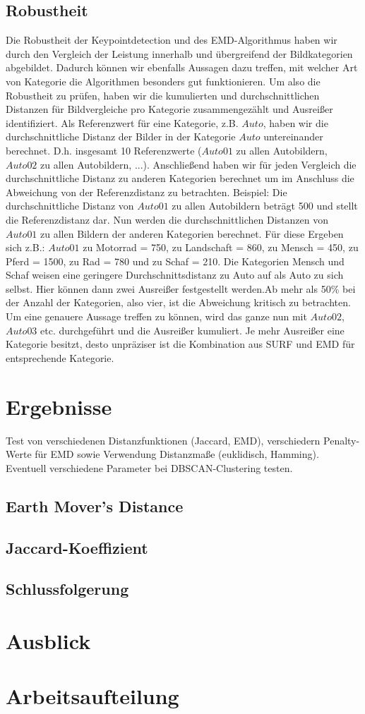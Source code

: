 \documentclass{scrartcl}
\begin{document}
\subsection{Robustheit}
Die Robustheit der Keypointdetection und des EMD-Algorithmus haben wir durch den Vergleich der Leistung innerhalb und übergreifend der Bildkategorien abgebildet. Dadurch können wir ebenfalls Aussagen dazu treffen, mit welcher Art von Kategorie die Algorithmen besonders gut funktionieren. Um also die Robustheit zu prüfen, haben wir die kumulierten und durchschnittlichen Distanzen für Bildvergleiche pro Kategorie zusammengezählt und Ausreißer identifiziert. Als Referenzwert für eine Kategorie, z.B. $Auto$, haben wir die durchschnittliche Distanz der Bilder in der Kategorie $Auto$ untereinander berechnet. D.h. insgesamt 10 Referenzwerte ($Auto01$ zu allen Autobildern, $Auto02$ zu allen Autobildern, ...). Anschließend haben wir für jeden Vergleich die durchschnittliche Distanz zu anderen Kategorien berechnet um im Anschluss die Abweichung von der Referenzdistanz zu betrachten.
Beispiel: Die durchschnittliche Distanz von $Auto01$ zu allen Autobildern beträgt 500 und stellt die Referenzdistanz dar. Nun werden die durchschnittlichen Distanzen von $Auto01$ zu allen Bildern der anderen Kategorien berechnet. Für diese Ergeben sich z.B.: $Auto01$ zu Motorrad = 750, zu Landschaft = 860, zu Mensch = 450, zu Pferd = 1500, zu Rad = 780 und zu Schaf = 210. Die Kategorien Mensch und Schaf weisen eine geringere Durchschnittsdistanz zu Auto auf als Auto zu sich selbst. Hier können dann zwei Ausreißer festgestellt werden.Ab mehr als 50\% bei der Anzahl der Kategorien, also vier, ist die Abweichung kritisch zu betrachten. Um eine genauere Aussage treffen zu können, wird das ganze nun mit $Auto02$, $Auto03$ etc. durchgeführt und die Ausreißer kumuliert. Je mehr Ausreißer eine Kategorie besitzt, desto unpräziser ist die Kombination aus SURF und EMD für entsprechende Kategorie.

\section{Ergebnisse}
Test von verschiedenen Distanzfunktionen (Jaccard, EMD), verschiedern Penalty-Werte für EMD sowie Verwendung Distanzmaße (euklidisch, Hamming). Eventuell verschiedene Parameter bei DBSCAN-Clustering testen.


\subsection{Earth Mover's Distance}

\subsection{Jaccard-Koeffizient}

\subsection{Schlussfolgerung}

\FloatBarrier

\section{Ausblick}

\section{Arbeitsaufteilung}
\end{document}
